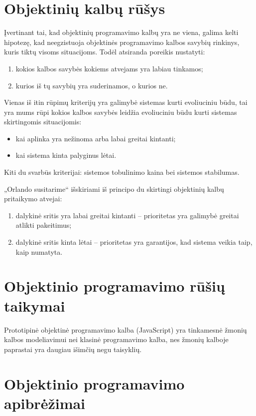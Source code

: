 \section{Objektinių kalbų rūšys}

Įvertinant tai, kad objektinių programavimo kalbų yra ne viena,
galima kelti hipotezę, kad neegzistuoja objektinės programavimo
kalbos savybių rinkinys, kuris tiktų visoms situacijoms. Todėl
atsiranda poreikis nustatyti:
\begin{enumerate}
  \item kokios kalbos savybės kokiems atvejams yra labiau tinkamos;
  \item kurios iš tų savybių yra suderinamos, o kurios ne.
\end{enumerate}
Vienas iš itin rūpimų kriterijų yra galimybė sistemas kurti evoliuciniu
būdu, tai yra mums rūpi kokios kalbos savybės leidžia evoliuciniu
būdu kurti sistemas skirtingomis situacijomis:
\begin{itemize}
  \item kai aplinka yra nežinoma arba labai greitai kintanti;
  \item kai sistema kinta palyginus lėtai.
\end{itemize}
Kiti du svarbūs kriterijai: sistemos tobulinimo kaina bei sistemos
stabilumas.

„Orlando susitarime“ išskiriami iš principo du skirtingi objektinių
kalbų pritaikymo atvejai:
\begin{enumerate}
  \item dalykinė sritis yra labai greitai kintanti – prioritetas yra
    galimybė greitai atlikti pakeitimus;
  \item dalykinė sritis kinta lėtai – prioritetas yra garantijos,
    kad sistema veikia taip, kaip numatyta.
\end{enumerate}

\section{Objektinio programavimo rūšių taikymai}

Prototipinė objektinė programavimo kalba (JavaScript) yra tinkamesnė
žmonių kalbos modeliavimui nei klasinė programavimo kalba, nes
žmonių kalboje paprastai yra daugiau išimčių negu taisyklių.

\section{Objektinio programavimo apibrėžimai}

